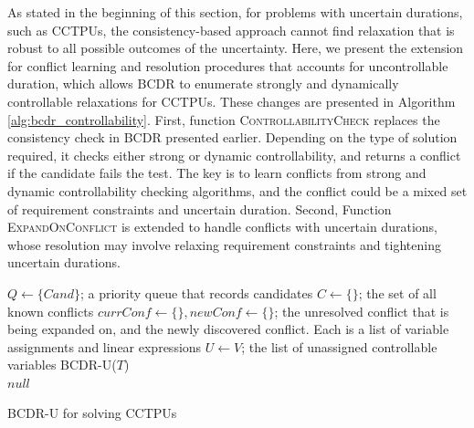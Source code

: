 \documentclass[jair,twoside,11pt,theapa]{article}
\let\oldnl\nl%
\newcommand{\nonl}{\renewcommand{\nl}{\let\nl\oldnl}}%
\begin{document}
As stated in the beginning of this section, for problems with uncertain
durations, such as CCTPUs, the consistency-based approach cannot find relaxation
that is robust to all possible outcomes of the uncertainty. Here, we
present the extension for conflict learning and resolution procedures that
accounts for uncontrollable duration, which allows BCDR to enumerate strongly
and dynamically controllable relaxations for CCTPUs. These changes are presented in Algorithm \ref{alg:bcdr_controllability}. First, function \textsc{ControllabilityCheck} replaces the consistency check in BCDR
presented earlier. Depending on the type of solution required, it checks either
strong or dynamic controllability, and returns a conflict if the candidate
fails the test. The key is to learn conflicts from strong and dynamic
controllability checking algorithms, and the conflict could be a mixed set of
requirement constraints and uncertain duration. Second, Function
\textsc{ExpandOnConflict} is extended to handle conflicts with uncertain
durations, whose resolution may involve relaxing requirement constraints and
tightening uncertain durations.


\begin{algorithm}[htb!]
	\SetAlgoLined
	\Indm
	\Initialize{}
	\;
	{$Q\leftarrow\{\mathit{Cand}\}$; a priority queue that records candidates}\;
	{$C\leftarrow\{\}$; the set of all known conflicts}\;
	{$\mathit{currConf}\leftarrow \{\}, \mathit{newConf}\leftarrow \{\}$; the unresolved conflict that is being expanded on, and the newly discovered conflict. Each is a list of variable assignments and linear expressions}\;
	{$U\leftarrow V$; the list of unassigned controllable variables}\;
	\Indm
	\Algorithm{}
	\nonl\textsc{BCDR-U}($\mathit{T}$)\\
	\Indp
\Return $null$\;
\caption{BCDR-U for solving CCTPUs}
\label{alg:bcdr_controllability}
\end{algorithm}
\end{document}
